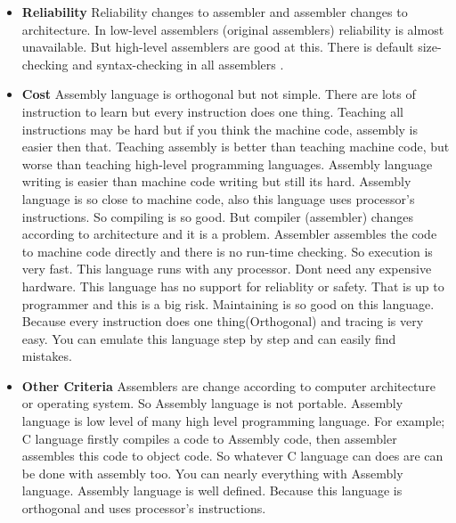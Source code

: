 \documentclass[11pt]{article}
\begin{document}
\begin{itemize}
	\item {{\bf Reliability}}
	\newline Reliability changes to assembler and assembler changes to architecture. In low-level assemblers (original assemblers) reliability is almost unavailable. But high-level assemblers are good at this. There is default size-checking and syntax-checking in all assemblers .
	\item {{\bf Cost}}
	 Assembly language is orthogonal but not simple. There are lots of instruction to learn but every instruction does one thing. Teaching all instructions may be hard but if you think the machine code, assembly is easier then that. Teaching assembly is better than teaching machine code, but worse than teaching high-level programming languages.
	 Assembly language writing is easier than machine code writing but still its hard.
	 Assembly language is so close to machine code, also this language uses processor's instructions. So compiling is so good. But compiler (assembler) changes according to architecture and it is a problem. 
	 Assembler assembles the code to machine code directly and there is no run-time checking. So execution is very fast.
	 This language runs with any processor. Dont need any expensive hardware.
	 This language has no support for reliablity or safety. That is up to programmer and this is a big risk.
	 Maintaining is so good on this language. Because every instruction does one thing(Orthogonal) and tracing is very easy. You can emulate this language step by step and can easily find mistakes.

	\item {{\bf Other Criteria}}
	 Assemblers are change according to computer architecture or operating system. So Assembly language is not portable.
	 Assembly language is low level of many high level programming language. For example; C language firstly compiles a code to Assembly code, then assembler assembles this code to object code. So whatever C language can does are can be done with assembly too. You can nearly everything with Assembly language.
	 Assembly language is well defined. Because this language is orthogonal and uses processor's instructions.
	
\end{itemize}
\newpage
\end{document}
